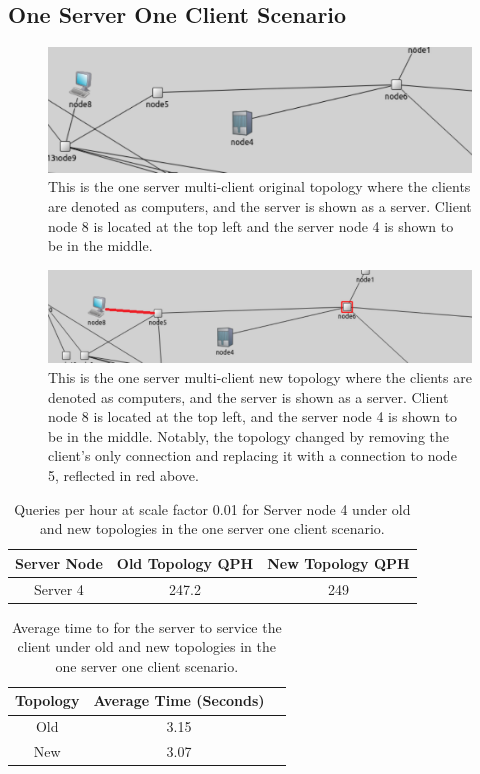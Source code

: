 \subsection{One Server One Client Scenario}

\begin{figure}[tp]
\centering
\includegraphics[width=0.5 \textwidth]{figures/SingleClientOrig}
\caption{This is the one server multi-client original topology where the clients are denoted as computers, and the server is shown as a server. Client node 8 is located at the top left and the server node 4 is shown to be in the middle.
}
\end{figure}

\begin{figure}[tp]
\centering
\includegraphics[width=0.5 \textwidth]{figures/SingleClientNew}
\caption{This is the one server multi-client new topology where the clients are denoted as computers, and the server is shown as a server. Client node 8 is located at the top left, and the server node 4 is shown to be in the middle. Notably, the topology changed by removing the client's only connection and replacing it with a connection to node 5, reflected in red above.
}
\end{figure}

\begin{table}[h!]
\centering
\begin{tabular}{|c|c|c|}
\hline
Server Node & Old Topology QPH & New Topology QPH \\ \hline
Server 4 & 247.2 & 249 \\ \hline
\end{tabular}
\caption{Queries per hour at scale factor 0.01 for Server node 4 under old and new topologies in the one server one client scenario.}
\label{tab:my_label}
\end{table}


\begin{table}[h!]
\centering
\begin{tabular}{|c|c|c|}
\hline
Topology & Average Time (Seconds) \\ \hline
Old & 3.15 \\ \hline
New & 3.07 \\ \hline
\end{tabular}
\caption{Average time to for the server to service the client under old and new topologies in the one server one client scenario.
}
\label{tab:avg_time_all_clients}
\end{table}


